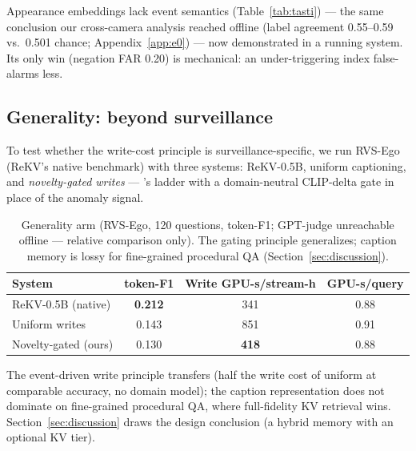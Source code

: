 Appearance embeddings lack event semantics (Table~\ref{tab:tasti}) --- the same conclusion our cross-camera analysis reached offline (label agreement 0.55--0.59 vs.\ 0.501 chance; Appendix~\ref{app:e0}) --- now demonstrated in a running system. Its only win (negation FAR 0.20) is mechanical: an under-triggering index false-alarms less.

\subsection{Generality: beyond surveillance}
\label{sec:exp-generality}

To test whether the write-cost principle is surveillance-specific, we run RVS-Ego (ReKV's native benchmark) with three systems: ReKV-0.5B, uniform captioning, and \emph{novelty-gated writes} --- \sys's ladder with a domain-neutral CLIP-delta gate in place of the anomaly signal.

\begin{table}[h]
\centering
\caption{Generality arm (RVS-Ego, 120 questions, token-F1; GPT-judge unreachable offline --- relative comparison only). The gating principle generalizes; caption memory is lossy for fine-grained procedural QA (Section~\ref{sec:discussion}).}
\label{tab:generality}
\small
\begin{tabular}{@{}lccc@{}}
\toprule
System & token-F1 & Write GPU-s/stream-h & GPU-s/query \\
\midrule
ReKV-0.5B (native) & \textbf{0.212} & 341 & 0.88 \\
Uniform writes & 0.143 & 851 & 0.91 \\
Novelty-gated (ours) & 0.130 & \textbf{418} & 0.88 \\
\bottomrule
\end{tabular}
\end{table}

The event-driven write principle transfers (half the write cost of uniform at comparable accuracy, no domain model); the caption representation does not dominate on fine-grained procedural QA, where full-fidelity KV retrieval wins. Section~\ref{sec:discussion} draws the design conclusion (a hybrid memory with an optional KV tier).
